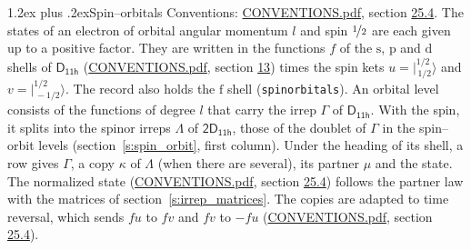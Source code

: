 \documentclass[10pt,a4paper]{article}
\makeatletter
\renewcommand\section{\@startsection{section}{1}{\z@}{-3ex plus -1ex minus -.2ex}%
  {1.2ex plus .2ex}{\normalfont\large\sffamily\bfseries\color{parttitle}}}
\numberwithin{equation}{section}
\newcommand{\grp}[1]{\mathsf{#1}}
\newcommand{\orbital}[1]{\mathrm{#1}}
\newcommand{\mult}{\kappa}
\newcommand{\intx}{\mu}
\newcommand{\jm}[2]{\bigl\lvert{}^{#1}_{\,#2}\bigr\rangle}
\makeatother
\begin{document}
\section{Spin--orbitals}\label{s:spin_orbitals}
Conventions: \href{../../CONVENTIONS.pdf}{CONVENTIONS.pdf}, section \href{../../CONVENTIONS.pdf\#conv.25.4}{25.4}.
\leavevmode\label{n:index.orbital.l}The states of an electron of orbital angular momentum $l$ and spin $\nicefrac{1}{2}$ are each given up to a positive factor. \label{n:local.spinor.uv}\label{n:local.function.f}They are written in the functions $f$ of the $\orbital{s}$, $\orbital{p}$ and $\orbital{d}$ shells of \href{../../../rotation/data/pdf/D11h.pdf}{$\grp{D_{11h}}$} (\href{../../CONVENTIONS.pdf}{CONVENTIONS.pdf}, section \href{../../../rotation/CONVENTIONS.pdf\#conv.13}{13}) times the spin kets $u = \jm{1/2}{1/2}$ and $v = \jm{1/2}{-1/2}$. The record also holds the $\orbital{f}$ shell (\texttt{spinorbitals}). An orbital level consists of the functions of degree $l$ that carry the irrep $\Gamma$ of \href{../../../rotation/data/pdf/D11h.pdf}{$\grp{D_{11h}}$}. With the spin, it splits into the spinor irreps $\Lambda$ of $\grp{2D_{11h}}$, those of the doublet of $\Gamma$ in the spin--orbit levels (section~\ref{s:spin_orbit}, first column). \label{n:head.state}Under the heading of its shell, a row gives $\Gamma$, a copy $\mult$ of $\Lambda$ (when there are several), its partner $\intx$ and the state. The normalized state (\href{../../CONVENTIONS.pdf}{CONVENTIONS.pdf}, section \href{../../CONVENTIONS.pdf\#conv.25.4}{25.4}) follows the partner law with the matrices of section~\ref{s:irrep_matrices}. The copies are adapted to time reversal, which sends $f u$ to $f v$ and $f v$ to $-f u$ (\href{../../CONVENTIONS.pdf}{CONVENTIONS.pdf}, section \href{../../CONVENTIONS.pdf\#conv.25.4}{25.4}).
\end{document}

